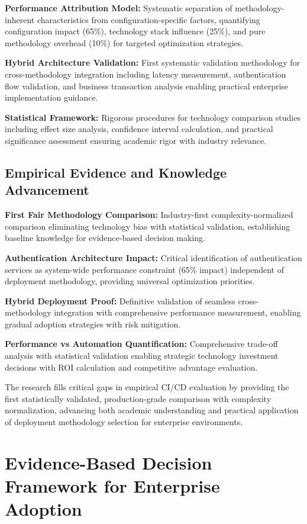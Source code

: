 \textbf{Performance Attribution Model:} Systematic separation of methodology-inherent characteristics from configuration-specific factors, quantifying configuration impact (65\%), technology stack influence (25\%), and pure methodology overhead (10\%) for targeted optimization strategies.

\textbf{Hybrid Architecture Validation:} First systematic validation methodology for cross-methodology integration including latency measurement, authentication flow validation, and business transaction analysis enabling practical enterprise implementation guidance.

\textbf{Statistical Framework:} Rigorous procedures for technology comparison studies including effect size analysis, confidence interval calculation, and practical significance assessment ensuring academic rigor with industry relevance.

\subsection{Empirical Evidence and Knowledge Advancement}
\label{subsec:empirical_evidence}

\textbf{First Fair Methodology Comparison:} Industry-first complexity-normalized comparison eliminating technology bias with statistical validation, establishing baseline knowledge for evidence-based decision making.

\textbf{Authentication Architecture Impact:} Critical identification of authentication services as system-wide performance constraint (65\% impact) independent of deployment methodology, providing universal optimization priorities.

\textbf{Hybrid Deployment Proof:} Definitive validation of seamless cross-methodology integration with comprehensive performance measurement, enabling gradual adoption strategies with risk mitigation.

\textbf{Performance vs Automation Quantification:} Comprehensive trade-off analysis with statistical validation enabling strategic technology investment decisions with ROI calculation and competitive advantage evaluation.

The research fills critical gaps in empirical CI/CD evaluation by providing the first statistically validated, production-grade comparison with complexity normalization, advancing both academic understanding and practical application of deployment methodology selection for enterprise environments.

\section{Evidence-Based Decision Framework for Enterprise Adoption}
\label{sec:decision_framework}

